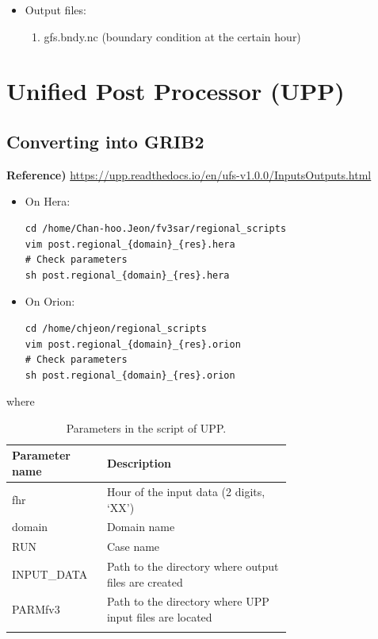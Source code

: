 \documentclass[11pt,fleqn]{report}              %
\begin{document}
\begin{itemize}
\item Output files:
\begin{enumerate}
\item gfs.bndy.nc (boundary condition at the certain hour)
\end{enumerate}
\end{itemize}





\chapter{Unified Post Processor (UPP)}
\label{chpt:post_upp}


\section{Converting into GRIB2}               
\label{sec:post_grb2}

{\bf Reference)} \url{https://upp.readthedocs.io/en/ufs-v1.0.0/InputsOutputs.html}


\begin{itemize}
\item On Hera:
\lstset{language=bash}   
\begin{lstlisting}[frame=trBL]
cd /home/Chan-hoo.Jeon/fv3sar/regional_scripts
vim post.regional_{domain}_{res}.hera
# Check parameters
sh post.regional_{domain}_{res}.hera
\end{lstlisting}

\item On Orion:
\lstset{language=bash}   
\begin{lstlisting}[frame=trBL]
cd /home/chjeon/regional_scripts
vim post.regional_{domain}_{res}.orion
# Check parameters
sh post.regional_{domain}_{res}.orion
\end{lstlisting}

\end{itemize}
where
{
\fontsize{10}{12}\selectfont
\begin{longtable}{p{0.15\linewidth} | p{0.55\linewidth} }
\hline
\hline
Parameter name & Description \\
\hline
 fhr & Hour of the input data (2 digits, `XX') \\
 domain & Domain name \\
 RUN & Case name \\
 INPUT\_DATA & Path to the directory where output files are created \\
 PARMfv3 & Path to the directory where UPP input files are located \\
\hline
\caption{Parameters in the script of UPP.}
\label{table:fv3_var_upp_script}
\end{longtable}
}
\end{document}
